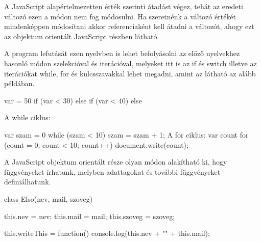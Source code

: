 A JavaScript alapértelmezetten érték szerinti átadást végez, tehát az eredeti változó ezen a módon nem fog módosulni. Ha szeretnénk a változó értékét mindenképpen módosítani akkor referenciaként kell átadni a változót, ahogy ezt az objektum orientált JavaScript részben látható.

A program lefutását ezen nyelvben is lehet befolyásolni az előző nyelvekhez hasonló módon szelekcióval és iterációval, melyeket itt is az if és switch illetve az iterációkat while, for és kulcsszavakkal lehet megadni, amint az látható az alább példában.

\begin{java}
var = 50
if (var < 30) {
}
else if (var < 40) {
}
else {
}
\end{java}

A while ciklus:
\begin{java}
var szam = 0
while (szam < 10) {
	szam = szam + 1;
}
A for ciklus:
var count
for (count = 0; count < 10; count++){
	document.write(count);
}
\end{java}

A JavaScript objektum orientált része olyan módon alakítható ki, hogy függvényeket írhatunk, melyben adattagokat és további függvényeket definiálhatunk.
\begin{java}
class Elso(nev, mail, szoveg) {
	this.nev = nev;
	this.mail = mail;
	this.szoveg = szoveg;

	this.writeThis = function() {
		console.log(this.nev + "" + this.mail);
}
}
\end{java}
